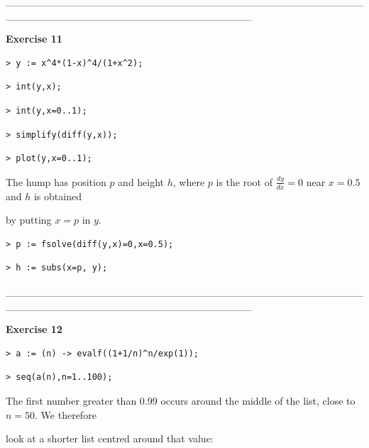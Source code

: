 \documentclass{article}
\begin{document}
\begin{Maple Normal}
\_\_\_\_\_\_\_\_\_\_\_\_\_\_\_\_\_\_\_\_\_\_\_\_\_\_\_\_\_\_\_\_\_\_\_\_\_\_\_\_\_\_\_\_\_\_\_\_\_\_\_\_\_\_\_\_\_\_\_\_\_\_\_\_\_\_\_\_\_\_\_\_\_\_\_\_\_\_\_\_\_
\end{Maple Normal}
\begin{Maple Heading 2}
\textbf{Exercise 11}
\end{Maple Heading 2}
\begin{lstlisting}
> y := x^4*(1-x)^4/(1+x^2);
\end{lstlisting}
\begin{lstlisting}
> int(y,x);
\end{lstlisting}
\begin{lstlisting}
> int(y,x=0..1);
\end{lstlisting}
\begin{lstlisting}
> simplify(diff(y,x));
\end{lstlisting}
\begin{lstlisting}
> plot(y,x=0..1);
\end{lstlisting}
\begin{Maple Normal}
The hump has position 
$p$ and height 
$h$, where 
$p$ is the root of 
$\frac{\mathit{dy}}{\mathit{dx}}=0$ near 
$x = 0.5$ and 
$h$ is obtained\

by putting 
$x =p$ in 
$y$.
\end{Maple Normal}
\begin{lstlisting}
> p := fsolve(diff(y,x)=0,x=0.5);
\end{lstlisting}
\begin{lstlisting}
> h := subs(x=p, y);
\end{lstlisting}
\begin{Maple Normal}
\_\_\_\_\_\_\_\_\_\_\_\_\_\_\_\_\_\_\_\_\_\_\_\_\_\_\_\_\_\_\_\_\_\_\_\_\_\_\_\_\_\_\_\_\_\_\_\_\_\_\_\_\_\_\_\_\_\_\_\_\_\_\_\_\_\_\_\_\_\_\_\_\_\_\_\_\_\_\_\_\_
\end{Maple Normal}
\begin{Maple Heading 2}
\textbf{Exercise 12}
\end{Maple Heading 2}
\begin{lstlisting}
> a := (n) -> evalf((1+1/n)^n/exp(1));
\end{lstlisting}
\begin{lstlisting}
> seq(a(n),n=1..100);
\end{lstlisting}
\begin{Maple Normal}
The first number greater than 0.99 occurs around the middle of the list, close to 
$n =50$.  We therefore\

look at a shorter list centred around that value:
\end{Maple Normal}
\end{document}
